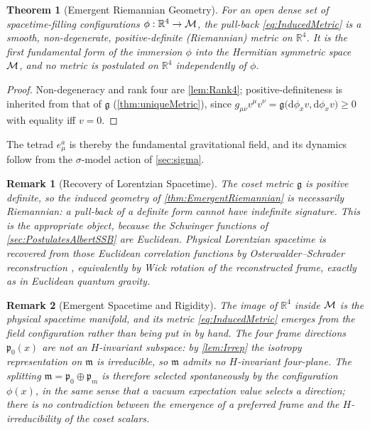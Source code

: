 \documentclass[pdflatex,sn-mathphys-num]{sn-jnl}
\theoremstyle{thmstyleone}
\newtheorem{theorem}{Theorem}
\theoremstyle{thmstylethree}%
\theoremstyle{thmstyletwo}%
\newtheorem{remark}[remark]{Remark}
\begin{document}
\begin{theorem}[Emergent Riemannian Geometry]\label{thm:EmergentRiemannian}
For an open dense set of spacetime-filling configurations
$\phi:\mathbb R^{4}\to\mathcal{M}$, the pull-back \eqref{eq:InducedMetric} is a
smooth, non-degenerate, positive-definite (Riemannian) metric on
$\mathbb R^{4}$. It is the first fundamental form of the immersion
$\phi$ into the Hermitian symmetric space $\mathcal{M}$, and no metric is postulated on
$\mathbb R^{4}$ independently of $\phi$.
\end{theorem}

\begin{proof}
Non-degeneracy and rank four are
\autoref{lem:Rank4}; positive-definiteness is inherited from that of
$\mathfrak g$ (\autoref{thm:uniqueMetric}), since
$g_{\mu\nu}v^{\mu}v^{\nu}=\mathfrak g\bigl(\mathrm d\phi_x v,\mathrm
d\phi_x v\bigr)\ge0$ with equality iff $v=0$.
\end{proof}

The tetrad $e_\mu^{ a}$ is thereby the fundamental gravitational field, and
its dynamics follow from the $\sigma$-model action of \autoref{sec:sigma}.

\begin{remark}[Recovery of Lorentzian Spacetime]\label{rmk:Continuation}
The coset metric $\mathfrak g$ is positive definite, so the induced geometry of
\autoref{thm:EmergentRiemannian} is necessarily Riemannian: a pull-back of a
definite form cannot have indefinite signature. This is the appropriate object,
because the Schwinger functions of \autoref{sec:PostulatesAlbertSSB} are
Euclidean. Physical Lorentzian spacetime is recovered from those Euclidean
correlation functions by Osterwalder--Schrader reconstruction
\cite{GlimmJaffe:1987}, equivalently by Wick rotation of the reconstructed
frame, exactly as in Euclidean quantum gravity.
\end{remark}

\begin{remark}[Emergent Spacetime and Rigidity]\label{rmk:Emergent}
The image of $\mathbb R^{4}$ inside $\mathcal{M}$ is the physical spacetime
manifold, and its metric \eqref{eq:InducedMetric} emerges from the field
configuration rather than being put in by hand. The four frame directions
$\mathfrak p_{0}(x)$ are not an $H$-invariant subspace: by
\autoref{lem:Irrep} the isotropy representation on $\mathfrak m$ is irreducible,
so $\mathfrak m$ admits no $H$-invariant four-plane. The splitting
$\mathfrak m=\mathfrak p_{0}\oplus\mathfrak p_{m}$ is therefore selected
spontaneously by the configuration $\phi(x)$, in the same sense that a
vacuum expectation value selects a direction; there is no contradiction between
the emergence of a preferred frame and the $H$-irreducibility of the coset
scalars.
\end{remark}
\end{document}
